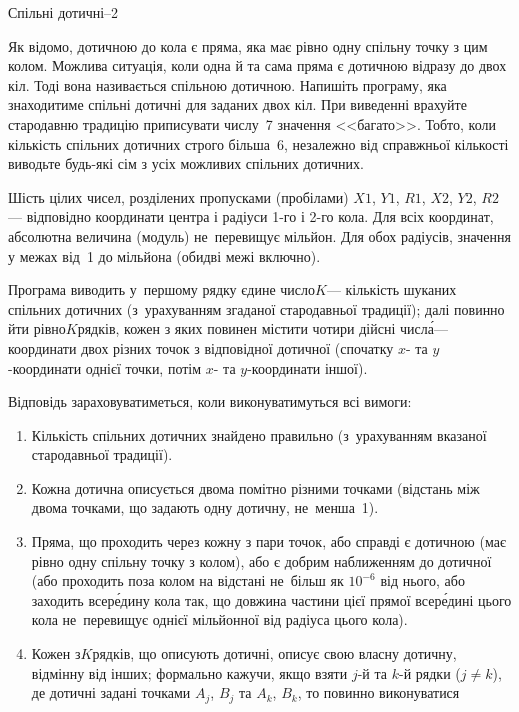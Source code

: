 ﻿\begin{problemAllDefault}{Спільні дотичні--2}

\begin{small}

Як відомо, дотичною до кола є пряма, яка має рівно одну спільну точку з цим колом. Можлива ситуація, коли одна й та сама пряма є дотичною  відразу до двох кіл. Тоді вона називається спільною дотичною. Напишіть програму, яка знаходитиме спільні дотичні для заданих двох кіл. При виведенні \mbox{врахуйте} стародавню традицію приписувати числу~7 значення <<багато>>. Тобто, коли кількість спільних дотичних строго більша~6, незалежно від справжньої кількості виводьте будь-які сім з усіх можливих спільних дотичних.

\InputFile
Шість цілих чисел, розділених пропусками (пробілами) $X1$, $Y1$, $R1$, $X2$, $Y2$, $R2$\nolinebreak[3] --- відповідно координати центра і радіуси \mbox{1-го} і \mbox{2-го} кола. Для всіх координат, абсолютна величина (модуль) не~перевищує мільйон. Для обох радіусів, значення у межах від~1 до мільйона (обидві межі включно).

\OutputFile
Програма виводить у~першому рядку єдине число\nolinebreak[3] $K$\nolinebreak[3] --- кількість шуканих спільних дотичних (з~урахуванням згаданої стародавньої традиції);
далі повинно йти рівно\nolinebreak[3] $K$\nolinebreak[3] рядків, кожен з яких повинен містити чотири дійсні числ\'{а}\nolinebreak[3] --- координати двох різних точок з відповідної дотичної (спочатку $x$- та $y$-координати однієї точки, потім $x$- та $y$-координати іншої).


Відповідь зараховуватиметься, коли виконуватимуться всі вимоги:
\begin{enumerate}
\item
Кількість спільних дотичних знайдено правильно (з~урахуванням вказаної стародавньої традиції).
\item
Кожна дотична описується двома помітно різними точками (відстань між двома точками, що задають одну дотичну, не~менша~1).
\item
Пряма, що проходить через кожну з пари точок, або справді є дотичною (має рівно одну спільну точку з колом), або є добрим наближенням до дотичної (або проходить поза колом на відстані не~більш як $10^{-6}$ від нього, або заходить всер\'{е}дину кола так, що довжина частини цієї прямої всер\'{е}дині цього кола не~перевищує однієї мільйонної від радіуса цього кола).
\item
Кожен з\nolinebreak[3] $K$\nolinebreak[3] рядків, що описують дотичні, описує свою власну дотичну, відмінну від інших; формально кажучи, якщо взяти \mbox{$j$-й} та \mbox{$k$-й} рядки ($j{\neq}k$), де дотичні задані точками $A_j$, $B_j$ та $A_k$, $B_k$, то повинно виконуватися


\end{enumerate}
\end{small}
\end{problemAllDefault}
